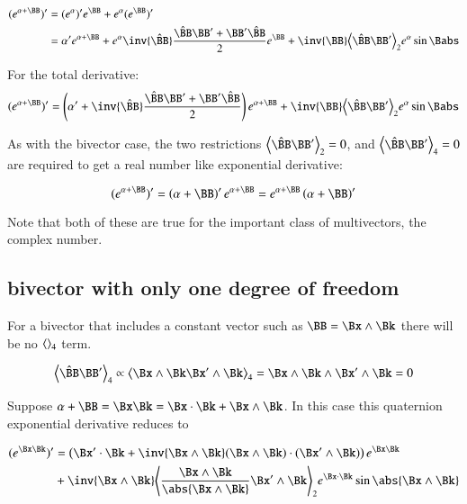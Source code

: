 \begin{align*}
(e^{\alpha + \BB})' 
&= (e^{\alpha})' e^{\BB} + e^{\alpha} (e^{\BB})' \\
&= \alpha' e^{\alpha + \BB} + e^{\alpha} 
\inv{\Bcap}\frac{\Bcap\BB' + \BB'\Bcap}{2} e^{\BB} + \inv{\BB}\gpgradetwo{\Bcap\BB'} e^{\alpha} \sin\Babs \\
\end{align*}

For the total derivative:
\begin{equation}
(e^{\alpha + \BB})' 
= \left(\alpha' + \inv{\Bcap}\frac{\Bcap\BB' + \BB'\Bcap}{2} \right) e^{\alpha + \BB}
+ \inv{\BB}\gpgradetwo{\Bcap\BB'} e^{\alpha} \sin\Babs
\end{equation}

As with the bivector case, the two restrictions 
$\gpgradetwo{\Bcap\BB'} = 0$, and $\gpgradefour{\Bcap\BB'} = 0$
are required to get a real number like exponential derivative:

\begin{equation}
(e^{\alpha + \BB})' 
= \left(\alpha + \BB\right)' e^{\alpha + \BB}
= e^{\alpha + \BB} \left(\alpha + \BB\right)' 
\end{equation}

Note that both of these are true for the important class of multivectors, the complex number.

\subsection{bivector with only one degree of freedom }

For a bivector that includes a constant vector such as $\BB = \Bx \wedge \Bk$ there will be no 
${\left\langle{{}}\right\rangle}_{4}$ term.

\[
\gpgradefour{\Bcap\BB'}
\propto \gpgradefour{\Bx \wedge \Bk \Bx' \wedge \Bk}
= \Bx \wedge \Bk \wedge \Bx' \wedge \Bk
= 0
\]

Suppose $\alpha + \BB = \Bx\Bk = \Bx \cdot \Bk + \Bx \wedge \Bk$.  In this case
this quaternion exponential derivative reduces to

\begin{align*}
(e^{\Bx\Bk})' 
&= \left(\Bx' \cdot \Bk + \inv{\Bx \wedge \Bk} (\Bx \wedge \Bk) \cdot (\Bx' \wedge \Bk) \right) e^{\Bx\Bk} \\
&+ \inv{\Bx \wedge \Bk}\gpgradetwo{\frac{\Bx \wedge \Bk}{\abs{\Bx \wedge \Bk}}\Bx' \wedge \Bk} e^{\Bx \cdot \Bk} \sin\abs{\Bx \wedge \Bk} \\
\end{align*}

